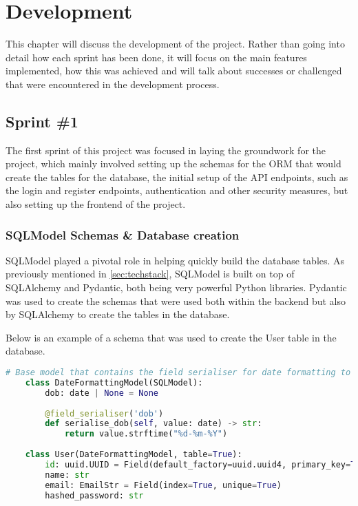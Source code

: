 \chapter{Development}

This chapter will discuss the development of the project. Rather than going into detail how each sprint has been done, it will focus on the main features implemented, how this was achieved and will talk about successes or challenged that were encountered in the development process.

\section{Sprint \#1}

The first sprint of this project was focused in laying the groundwork for the project, which mainly involved setting up the schemas for the ORM that would create the tables for the database, the initial setup of the API endpoints, such as the login and register endpoints, authentication and other security measures, but also setting up the frontend of the project.

\subsection{SQLModel Schemas \& Database creation}

SQLModel played a pivotal role in helping quickly build the database tables. As previously mentioned in \ref{sec:techstack}, SQLModel is built on top of SQLAlchemy and Pydantic, both being very powerful Python libraries. Pydantic was used to create the schemas that were used both within the backend but also by SQLAlchemy to create the tables in the database. 

Below is an example of a schema that was used to create the User table in the database.

\begin{lstlisting}[language=Python, caption=SQLModel User Schema]
# Base model that contains the field serialiser for date formatting to dd-mm-yyyy and the date field itself
    class DateFormattingModel(SQLModel):
        dob: date | None = None
    
        @field_serialiser('dob')
        def serialise_dob(self, value: date) -> str:
            return value.strftime("%d-%m-%Y")
    
    class User(DateFormattingModel, table=True):
        id: uuid.UUID = Field(default_factory=uuid.uuid4, primary_key=True)
        name: str
        email: EmailStr = Field(index=True, unique=True)
        hashed_password: str
\end{lstlisting}

